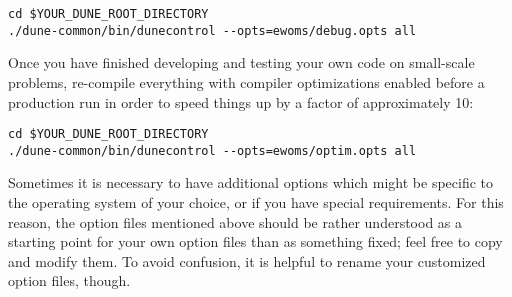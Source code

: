 \begin{lstlisting}[style=Bash]
cd $YOUR_DUNE_ROOT_DIRECTORY
./dune-common/bin/dunecontrol --opts=ewoms/debug.opts all
\end{lstlisting}

Once you have finished developing and testing your own code on
small-scale problems, re-compile everything with compiler
optimizations enabled before a production run in order to speed things
up by a factor of approximately 10:

\begin{lstlisting}[style=Bash]
cd $YOUR_DUNE_ROOT_DIRECTORY
./dune-common/bin/dunecontrol --opts=ewoms/optim.opts all
\end{lstlisting}

Sometimes it is necessary to have additional options which might be
specific to the operating system of your choice, or if you have
special requirements.  For this reason, the option files mentioned
above should be rather understood as a starting point for your own
option files than as something fixed; feel free to copy and modify
them. To avoid confusion, it is helpful to rename your
customized option files, though.

